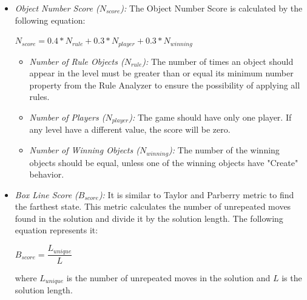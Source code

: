 \documentclass[letterpaper]{article}
\begin{document}
\begin{itemize}
	\item \emph{Object Number Score ($N_{score}$):} The Object Number Score is calculated by the following equation:
	\begin{center}$N_{score} = 0.4 * N_{rule} + 0.3 * N_{player} + 0.3 * N_{winning}$\end{center}
	\begin{itemize}
		\item \emph{Number of Rule Objects ($N_{rule}$):} The number of times an object should appear in the level must be greater than or equal its minimum number property from the Rule Analyzer to ensure the possibility of applying all rules.
		\item \emph{Number of Players ($N_{player}$):} The game should have only one player. If any level have a different value, the score will be zero.
		\item \emph{Number of Winning Objects ($N_{winning}$):} The number of the winning objects should be equal, unless one of the winning objects have "Create" behavior.
	\end{itemize}
	
	\item \emph{Box Line Score ($B_{score}$):} It is similar to Taylor and Parberry metric\cite{sokobanLevelGenerationNew} to find the farthest state. This metric calculates the number of unrepeated moves found in the solution and divide it by the solution length. The following equation represents it:
	\begin{center}$B_{score} = \dfrac{L_{unique}}{L}$\end{center}
	where $L_{unique}$ is the number of unrepeated moves in the solution and $L$ is the solution length.
	

\end{itemize}
\end{document}
